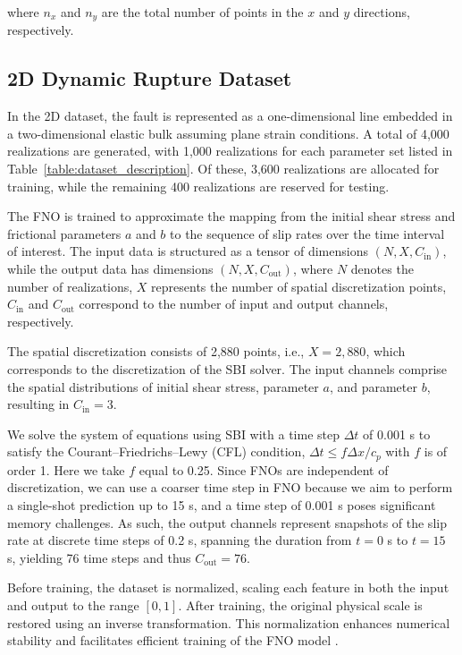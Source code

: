 \documentclass[draft]{agujournal2019}
\begin{document}
where \( n_x \) and \( n_y \) are the total number of points in the \( x \) and \( y \) directions, respectively.


\subsection{2D Dynamic Rupture Dataset}
\label{sec:2d}

In the 2D dataset, the fault is represented as a one-dimensional line embedded in a two-dimensional elastic bulk assuming plane strain conditions. A total of 4,000 realizations are generated, with 1,000 realizations for each parameter set listed in Table~\ref{table:dataset_description}. Of these, 3,600 realizations are allocated for training, while the remaining 400 realizations are reserved for testing.

The FNO is trained to approximate the mapping from the initial shear stress and frictional parameters \( a \) and \( b \) to the sequence of slip rates over the time interval of interest. The input data is structured as a tensor of dimensions \( (N, X, C_{\text{in}}) \), while the output data has dimensions \( (N, X, C_{\text{out}}) \), where \( N \) denotes the number of realizations, \( X \) represents the number of spatial discretization points, \( C_{\text{in}} \) and \( C_{\text{out}} \) correspond to the number of input and output channels, respectively.

The spatial discretization consists of 2,880 points, i.e., \( X = 2,880 \), which corresponds to the discretization of the SBI solver. The input channels comprise the spatial distributions of initial shear stress, parameter \( a \), and parameter \( b \), resulting in \( C_{\text{in}} = 3 \).

We solve the system of equations using SBI with a time step \(\Delta t\) of 0.001 s to satisfy the Courant–Friedrichs–Lewy (CFL) condition, \(\Delta t \leq f \Delta x/c_p\) with \(f\) is of order 1. Here we take \(f\) equal to 0.25. Since FNOs are independent of discretization, we can use a coarser time step in FNO because we aim to perform a single-shot prediction up to 15 s, and a time step of 0.001 s poses significant memory challenges. As such, the output channels represent snapshots of the slip rate at discrete time steps of 0.2 s, spanning the duration from \( t = 0 \) s to \( t = 15 \) s, yielding 76 time steps and thus \( C_{\text{out}} = 76 \).

Before training, the dataset is normalized, scaling each feature in both the input and output to the range \([0,1]\). After training, the original physical scale is restored using an inverse transformation. This normalization enhances numerical stability and facilitates efficient training of the FNO model \cite{cuomo2022scientific}.
\end{document}

